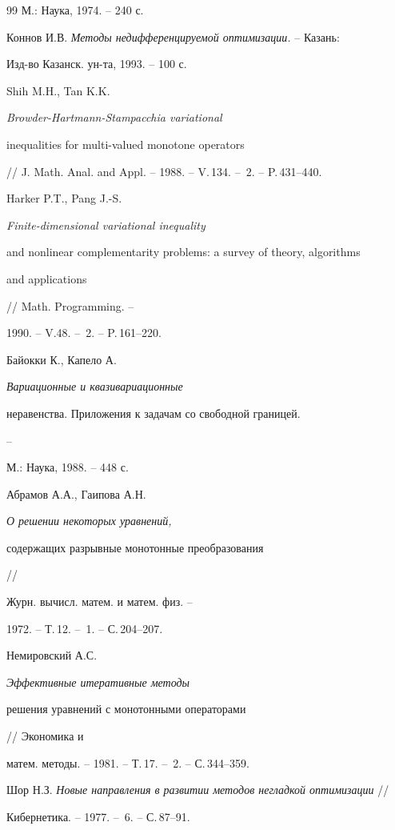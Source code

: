 \begin{thebibliography}{99}
М.: Наука, 1974. -- 240 с.




Коннов И.В. {\em Методы недифференцируемой оптимизации.} -- Казань:


Изд-во Казанск. ун-та, 1993. -- 100 с.




Shih M.H., Tan K.K. {\em Browder-Hartmann-Stampacchia variational


inequalities for multi-valued monotone operators}


// J. Math. Anal. and Appl. -- 1988. -- V.\,134. -- \No\,2. -- P.\,431--440.




Harker P.T., Pang J.-S. {\em Finite-dimensional variational inequality


and nonlinear complementarity problems: a survey of theory, algorithms


and applications} // Math. Programming. --


1990. -- V.48. -- \No\,2. -- P.\,161--220.




Байокки К., Капело А. {\em Вариационные и квазивариационные


неравенства. Приложения к задачам со свободной границей.} --


М.: Наука, 1988. -- 448 с.




Абрамов А.А., Гаипова А.Н. {\em О решении некоторых уравнений,


содержащих разрывные монотонные преобразования} //


Журн. вычисл. матем. и матем. физ. --


1972. -- Т.\,12. -- \No\,1. -- С.\,204--207.




Немировский А.С. {\em Эффективные итеративные методы


решения уравнений с монотонными операторами} // Экономика и


матем. методы. -- 1981. -- Т.\,17. -- \No\,2. -- С.\,344--359.




Шор Н.З. {\em Новые направления в развитии методов негладкой оптимизации} //


Кибернетика. -- 1977. -- \No\,6. -- С.\,87--91.





\end{thebibliography}





\vskip 0.5cm












\label{end}





